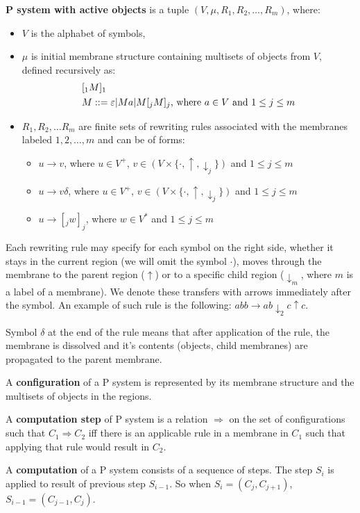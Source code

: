 {\bf P system with active objects} is a tuple $(V, \mu, R_1, R_2, \dots , R_m)$, where:
\begin{itemize}
  \item $V$ is the alphabet of symbols,
  \item $\mu$ is initial membrane structure containing multisets of objects from $V$, defined recursively as:
  \begin{align*}
    &[_1 M]_1 \\
    &M ::= \varepsilon | M a | M [_j M]_j\text{, where }a\in V\text{ and } 1\leq j\leq m
  \end{align*}
  \item $R_1,R_2,\dots R_m$ are finite sets of rewriting rules associated with the membranes labeled $1,2,\dots,m$ and can be of forms:
  \begin{itemize}
    \item $u\rightarrow v$, where $u\in V^+$, $v\in (V\times\{\cdot, \uparrow, \downarrow_j\})$ and $1\leq j\leq m$
    \item $u\rightarrow v\delta$, where $u\in V^+$, $v\in (V\times\{\cdot, \uparrow, \downarrow_j\})$ and $1\leq j\leq m$
    \item $u\rightarrow [_j w]_j$, where $w\in V^*$ and $1\leq j\leq m$
  \end{itemize}
\end{itemize}

Each rewriting rule may specify for each symbol on the right side, whether it stays in the current region (we will omit the symbol $\cdot$), moves through the membrane to the parent region ($\uparrow$)
or to a specific child region ($\downarrow_m$, where $m$ is a label of a membrane).
We denote these transfers with arrows immediately after the symbol.
An example of such rule is the following: $abb\rightarrow ab\downarrow_2 c\uparrow c$.

Symbol $\delta$ at the end of the rule means that after application of the rule, the membrane is dissolved and it's contents (objects, child membranes) are propagated to the parent membrane.

A {\bf configuration} of a P system is represented by its membrane structure and the multisets of objects in the regions.

A {\bf computation step} of P system is a relation $\Rightarrow$ on the set of configurations such that $C_1 \Rightarrow C_2$ iff there is an applicable rule in a membrane in $C_1$ such that applying that rule would result in $C_2$.

A {\bf computation} of a P system consists of a sequence of steps. The step $S_i$ is applied to result of previous step $S_{i-1}$. So when $S_i = (C_j,C_{j+1})$, $S_{i-1} = (C_{j-1},C_j)$.

